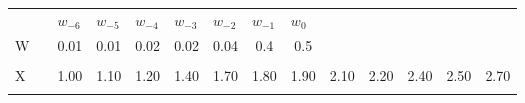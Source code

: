 \begin{frame}
\begin{columns}
\begin{overlayarea}{\textwidth}{\textheight}
\begin{minipage}[t]{0.25\textwidth}
{\begin{table}[h]
{\begin{tabular}{p{0.1cm}p{0.1cm}p{0.1cm}p{0.1cm}p{0.1cm}p{0.1cm}p{0.1cm}p{0.1cm}p{0.1cm}p{0.1cm}p{0.1cm}p{0.1cm}p{0.1cm}p{0.1cm}}
								                     &                       & $w_{-6}$                  & $w_{-5}$                  & $w_{-4}$                  & $w_{-3}$                  & $w_{-2}$                  & $w_{-1}$                                         & $w_{0}$                                          &                                                  &                                                  &                                                  &                                                  &                                                  \\ \cline{8-9}
								\cline{3-9}
								W                    & \multicolumn{1}{l|}{} & \multicolumn{1}{c|}{0.01} & \multicolumn{1}{c|}{0.01} & \multicolumn{1}{c|}{0.02} & \multicolumn{1}{c|}{0.02} & \multicolumn{1}{c|}{0.04} & \multicolumn{1}{c|}{0.4}                         & \multicolumn{1}{c|}{0.5}                         &                                                  &                                                  &                                                  &                                                  &                                                  \\ \cline{3-9}
								\multicolumn{1}{l}{} &                       & \multicolumn{1}{l}{}      & \multicolumn{1}{l}{}      & \multicolumn{1}{l}{}      & \multicolumn{1}{l}{}      & \multicolumn{1}{l}{}      & \multicolumn{1}{l}{}                             & \multicolumn{1}{l}{}                             & \multicolumn{1}{l}{}                             &                                                  &                                                  &                                                  &                                                  \\ \cline{3-14} 
								X                    & \multicolumn{1}{l|}{} & \multicolumn{1}{c|}{1.00} & \multicolumn{1}{c|}{1.10} & \multicolumn{1}{c|}{1.20} & \multicolumn{1}{c|}{1.40} & \multicolumn{1}{c|}{1.70} & \multicolumn{1}{c|}{1.80}                        & \multicolumn{1}{c|}{1.90}                        & \multicolumn{1}{c|}{2.10}                        & \multicolumn{1}{c|}{2.20}                        & \multicolumn{1}{c|}{2.40}                        & \multicolumn{1}{c|}{2.50}                        & \multicolumn{1}{c|}{2.70}                        \\ \cline{3-14} 
								\multicolumn{1}{l}{} &                       & \multicolumn{1}{l}{}      & \multicolumn{1}{l}{}      & \multicolumn{1}{l}{}      & \multicolumn{1}{l}{}      & \multicolumn{1}{l}{}      & \multicolumn{1}{l}{}                             & \multicolumn{1}{l}{}                             & \multicolumn{1}{l}{}                             &                                                  &                                                  &                                                  &                                                  \\  \cline{9-14} 

\end{tabular}}
\end{table}}
\end{minipage}
\end{overlayarea}
\end{columns}
\end{frame}
